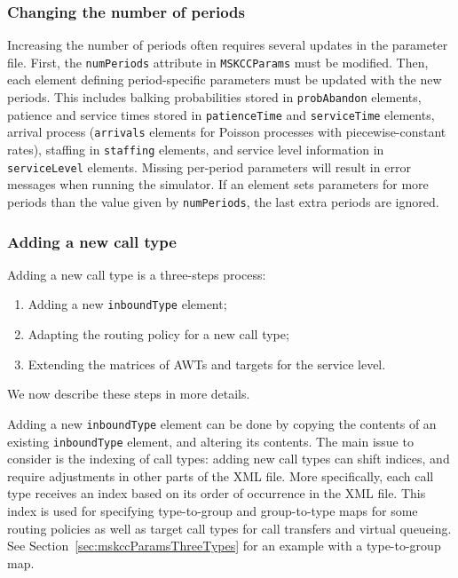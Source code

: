 \subsubsection{Changing the number of periods}

Increasing the number of periods often requires several updates in the
parameter file. First, the \texttt{num\-Periods} attribute in
\texttt{MSKCCParams} must be modified.
Then, each element defining period-specific parameters must be updated
with the new periods.
This includes balking probabilities
stored in \texttt{prob\-Abandon} elements,
patience and service times stored in
\texttt{patience\-Time} and \texttt{service\-Time} elements,
arrival process (\texttt{arrivals} elements for
Poisson processes with piecewise-constant rates), staffing
in \texttt{staffing} elements, and service
level information
in \texttt{service\-Level} elements.
Missing per-period parameters will result in error messages when
running the simulator.
If an element sets parameters for more periods than the value given by
\texttt{num\-Periods}, the last extra periods are ignored.

\subsubsection{Adding a new call type}

Adding a new call type is a three-steps process:
\begin{enumerate}
\item Adding a new \texttt{inbound\-Type} element;
\item Adapting the routing policy for a new call type;
\item Extending the matrices of AWTs and targets for the service level.
\end{enumerate}
We now describe these steps in more details.

Adding a new \texttt{inbound\-Type} element can be done by copying the
contents of an existing \texttt{inbound\-Type} element, and
altering its contents.
The main issue to consider is the indexing of call types:
adding new call types can shift indices, and require adjustments in
other parts of the XML file.
More specifically, each call type receives an index based on its order
of occurrence in the XML file.
This index is used for specifying type-to-group and
group-to-type maps for some routing policies as well as
target call types for call transfers and virtual queueing.
See Section~\ref{sec:mskccParamsThreeTypes} for an example with a
type-to-group map.

